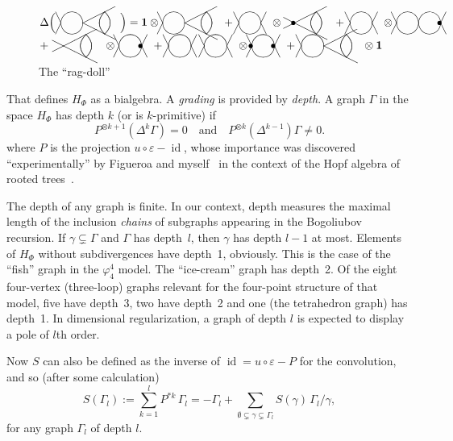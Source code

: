 \documentclass[a4paper,12pt]{article}
\newcommand{\Dl}{\Delta}            %
\newcommand{\eps}{\varepsilon}      %
\newcommand{\Ga}{\Gamma}            %
\newcommand{\ga}{\gamma}            %
\DeclareMathOperator{\id}{id}       %
\newcommand{\ox}{\otimes}           %
\newcommand{\sepword}[1]{\quad\text{#1}\quad} %
\newcommand{\1}{\mathbf{1}}         %
\newcommand{\7}{\dagger}            %
\newcommand{\8}{\bullet}            %
\renewcommand{\.}{\cdot}            %
\renewcommand{\:}{\colon}           %
\newcommand{\sweet}{%
\parbox{10mm}{\begin{picture}(20,10)
\put(0,5){\line(-1,2){5}}
\put(0,5){\line(-1,-2){5}}
\put(10,5){\circle{20}}
\put(20,5){\line(1,2){5}}
\put(20,5){\line(1,-2){5}}
\end{picture}}
}
\newcommand{\dsweet}{%
\parbox{15mm}{\begin{picture}(20,10)
\put(0,5){\line(-1,2){5}}
\put(0,5){\line(-1,-2){5}}
\put(10,5){\circle{20}}
\put(30.2,5){\circle{20}}
\put(40.2,5){\line(1,2){5}}
\put(40.2,5){\line(1,-2){5}}
\end{picture}}
}
\newcommand{\kg}{%
\parbox{19mm}{\begin{picture}(20,10)
\put(0,5){\line(-1,2){5}}
\put(0,5){\line(-1,-2){5}}
\put(10,5){\circle{20}}
\put(20,5){\line(2,1){30}}
\put(20,5){\line(2,-1){30}}
\qbezier(35,5)(35,10)(40,15)
\qbezier(35,5)(35,0)(40,-5)
\qbezier(45,5)(45,10)(40,15)
\qbezier(45,5)(45,0)(40,-5)
\end{picture}}
}
\newcommand{\pinterIV}{%
\parbox{16mm}{\begin{picture}(20,10)
\put(10,5){\line(-2,-1){10}}
\put(10,5){\line(-2,1){10}}
\put(10,5){\line(2,1){30}}
\put(10,5){\line(2,-1){30}}
\qbezier(25,5)(25,10)(30,15)
\qbezier(25,5)(25,0)(30,-5)
\qbezier(35,5)(35,10)(30,15)
\qbezier(35,5)(35,0)(30,-5)
\end{picture}}
}
\begin{document}
\begin{figure}[htb]
\centering
$$
\Dl \Bigl(\,\,\, \kg \Bigr) = \1 \ox \,\kg + \
\sweet \ox \pinterIV\put(-39,0){$\bullet$} + \
\sweet \ox \,\dsweet\put(-6,0){$\bullet$}
$$
$$
+ \ \pinterIV \ox \,\sweet\put(-12,0){$\bullet$} + \
\sweet\ \sweet \ox \,\sweet\put(-32,0){$\bullet$}
\put(-12,0){$\bullet$} + \ \kg \ox \1
$$
\caption{The ``rag-doll''}
\label{fig:ragdoll}
\end{figure}


That defines $H_\Phi$ as a bialgebra. A {\it grading\/} is provided by
\textit{depth}. A graph $\Ga$ in the space $H_\Phi$ has depth $k$ (or
is $k$-primitive) if
$$
P^{\otimes k+1}(\Dl^k\Ga) = 0  \sepword{and}
P^{\otimes k}(\Dl^{k-1})\Ga \neq 0.
$$
where $P$ is the projection $u\circ\eps - \id$, whose importance was
discovered ``experimentally'' by Figueroa and myself~\cite{Ananke} in
the context of the Hopf algebra of rooted trees~\cite{ConnesKrHopf}.

The depth of any graph is finite. In our context, depth measures the
maximal length of the inclusion \textit{chains} of subgraphs appearing
in the Bogoliubov recursion. If $\ga\subsetneq\Ga$ and $\Ga$ has
depth~$l$, then $\ga$ has depth $l-1$ at most. Elements of $H_\Phi$
without subdivergences have depth~1, obviously. This is the case of
the ``fish'' graph in the $\varphi^4_4$ model. The ``ice-cream'' graph
has depth~2. Of the eight four-vertex (three-loop) graphs relevant for
the four-point structure of that model, five have depth~3, two have
depth~2 and one (the tetrahedron graph) has depth~1. In dimensional
regularization, a graph of depth $l$ is expected to display a pole of
$l$th order.

Now $S$ can also be defined as the inverse of $\id = u\circ\eps - P$
for the convolution, and so (after some calculation)
\begin{equation}
S(\Ga_l) := \sum_{k=1}^l P^{*k}\,\Ga_l =
-\Ga_l + \sum_{\emptyset\subsetneq\ga\subsetneq\Ga_l}S(\ga)\,\Ga_l/\ga,
\label{eq:graph-antp}
\end{equation}
for any graph $\Ga_l$ of depth $l$.
\end{document}
